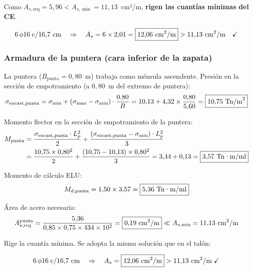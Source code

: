 Como $A_{s,\mathrm{req}} = 5{,}96 < A_{s,\min} = 11{,}13$~cm²/m,
\textbf{rigen las cuantías mínimas del CE}.

\begin{resultadobox}
  \[
    6\,\phi 16 \;\text{c}/16{,}7~\text{cm}
    \quad\Rightarrow\quad
    A_s = 6 \times 2{,}01 = \boxed{12{,}06~\text{cm}^2/\text{m}}
    > 11{,}13~\text{cm}^2/\text{m} \quad\checkmark
  \]
\end{resultadobox}

\subsubsection{Armadura de la puntera (cara inferior de la zapata)}
\label{subsubsec:armado_puntera}

La puntera ($B_{\mathrm{punta}} = 0{,}80$~m) trabaja como ménsula ascendente.
Presión en la sección de empotramiento (a $0{,}80$~m del extremo de puntera):
\begin{equation}
  \sigma_{\mathrm{encast,punta}} = \sigma_{\min}
    + (\sigma_{\max} - \sigma_{\min})\cdot\frac{0{,}80}{B}
  = 10{,}13 + 4{,}32\times\frac{0{,}80}{5{,}60}
  = \boxed{10{,}75~\text{Tn/m}^2}
\end{equation}

Momento flector en la sección de empotramiento de la puntera:
\begin{align}
  M_{\mathrm{punta}} &= \frac{\sigma_{\mathrm{encast,punta}}\cdot L_p^2}{2}
    + \frac{(\sigma_{\mathrm{encast,punta}} - \sigma_{\min})\cdot L_p^2}{3} \notag \\
  &= \frac{10{,}75\times 0{,}80^2}{2}
    + \frac{(10{,}75-10{,}13)\times 0{,}80^2}{3}
  = 3{,}44 + 0{,}13 = \boxed{3{,}57~\text{Tn·m/ml}}
\end{align}

Momento de cálculo ELU:
\begin{equation}
  M_{d,\mathrm{punta}} = 1{,}50 \times 3{,}57 = \boxed{5{,}36~\text{Tn·m/ml}}
  \label{eq:Md_punta}
\end{equation}

Área de acero necesaria:
\[
  A_{s,\mathrm{req}}^{\mathrm{punta}}
    = \frac{5{,}36}{0{,}85\times 0{,}75\times 434\times 10^2}
    = \boxed{0{,}19~\text{cm}^2/\text{m}}
    \ll A_{s,\min} = 11{,}13~\text{cm}^2/\text{m}
\]

Rige la cuantía mínima. Se adopta la misma solución que en el talón:

\begin{resultadobox}
  \[
    6\,\phi 16 \;\text{c}/16{,}7~\text{cm}
    \quad\Rightarrow\quad
    A_s = \boxed{12{,}06~\text{cm}^2/\text{m}} > 11{,}13~\text{cm}^2/\text{m}\;\checkmark
  \]
\end{resultadobox}

